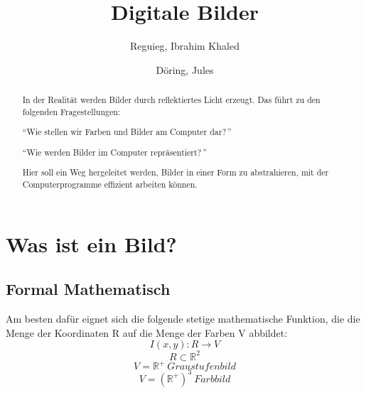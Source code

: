 \documentclass[tog]{acmsiggraph}
\title{Digitale Bilder}
\author{Reguieg, Ibrahim Khaled
\and Döring, Jules}
\begin{document}


\maketitle



\begin{abstract}
In der Realität werden Bilder durch reflektiertes Licht erzeugt.
Das führt zu den folgenden Fragestellungen:

"`Wie stellen wir Farben und Bilder am Computer dar?\,"'

"`Wie werden Bilder im Computer repräsentiert?\,"'

Hier soll ein Weg hergeleitet werden, Bilder in einer Form zu abstrahieren, mit der Computerprogramme effizient arbeiten können.
\end{abstract}

\section{Was ist ein Bild?}

\subsection{Formal Mathematisch}
Am besten dafür eignet sich die folgende stetige mathematische Funktion, die die Menge der Koordinaten R auf die Menge der Farben V abbildet:
\begin{equation}I(x,y): R \rightarrow V\end{equation}
\begin{equation}R\subset \mathbb{R}^2\end{equation}
\begin{equation}V = \mathbb{R}^+ \: Graustufenbild\end{equation}
\begin{equation}V = \left (\mathbb{R}^+  \right )^3 \: Farbbild\end{equation}
\end{document}

